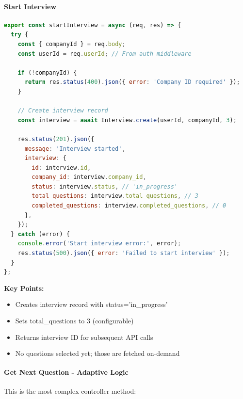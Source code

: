 \documentclass[12pt,a4paper,oneside]{article}
\begin{document}
\paragraph{Start Interview}

\begin{lstlisting}[language=JavaScript, caption=Start Interview Endpoint]
export const startInterview = async (req, res) => {
  try {
    const { companyId } = req.body;
    const userId = req.userId; // From auth middleware
    
    if (!companyId) {
      return res.status(400).json({ error: 'Company ID required' });
    }
    
    // Create interview record
    const interview = await Interview.create(userId, companyId, 3);
    
    res.status(201).json({
      message: 'Interview started',
      interview: {
        id: interview.id,
        company_id: interview.company_id,
        status: interview.status, // 'in_progress'
        total_questions: interview.total_questions, // 3
        completed_questions: interview.completed_questions, // 0
      },
    });
  } catch (error) {
    console.error('Start interview error:', error);
    res.status(500).json({ error: 'Failed to start interview' });
  }
};
\end{lstlisting}

\textbf{Key Points:}

\begin{itemize}
    \item Creates interview record with status='in\_progress'
    \item Sets total\_questions to 3 (configurable)
    \item Returns interview ID for subsequent API calls
    \item No questions selected yet; those are fetched on-demand
\end{itemize}

\paragraph{Get Next Question - Adaptive Logic}

This is the most complex controller method:
\end{document}
